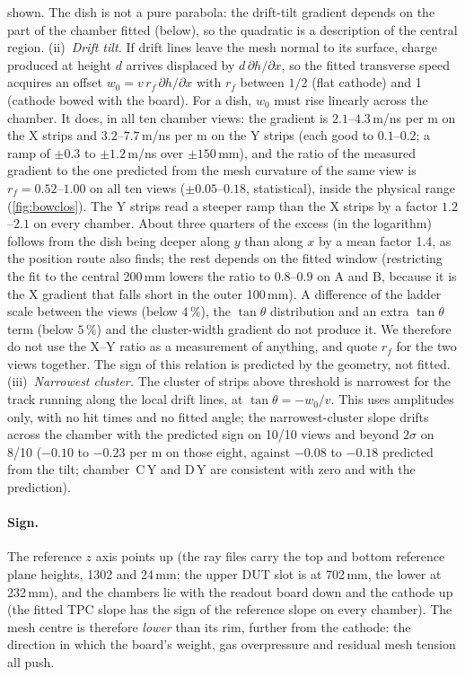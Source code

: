 shown. The dish is not a pure parabola: the drift-tilt gradient depends on the part of the chamber fitted (below), so the quadratic is a description of the
central region.
(ii)~\emph{Drift tilt.} If drift lines leave the mesh normal to its surface, charge produced at height $d$ arrives
displaced by $d\,\partial h/\partial x$, so the fitted transverse speed acquires an offset
$w_0 = v\,r_f\,\partial h/\partial x$ with $r_f$ between $1/2$ (flat cathode) and 1 (cathode bowed with the board).
For a dish, $w_0$ must rise linearly across the chamber. It does, in all ten chamber views: the gradient is
$2.1$--$4.3$\,\textmu m/ns per m on the X strips and $3.2$--$7.7$\,\textmu m/ns per m on the Y strips (each good to $0.1$--$0.2$; a ramp of $\pm0.3$ to
$\pm1.2$\,\textmu m/ns over $\pm150$\,mm), and the ratio of the measured gradient to the one predicted from the mesh curvature of the
same view is $r_f = 0.52$--$1.00$ on all ten views ($\pm0.05$--$0.18$, statistical), inside the physical range (\cref{fig:bowclos}). The Y strips read a steeper ramp than the X strips by a factor
$1.2$--$2.1$ on every chamber. About three quarters of the excess (in the logarithm) follows from the dish being deeper along $y$ than along $x$ by a mean
factor 1.4, as the position route also finds; the rest depends on the fitted window (restricting the fit to the central 200\,mm lowers the ratio to
$0.8$--$0.9$ on A and B, because it is the X gradient that falls short in the outer 100\,mm). A difference of the ladder scale between the views (below $4\,\%$),
the $\tan\theta$ distribution and an extra $\tan\theta$ term (below $5\,\%$) and the cluster-width gradient do not produce it. We therefore do not use the X--Y
ratio as a measurement of anything, and quote $r_f$ for the two views together. The sign of this relation is predicted by the geometry, not fitted.
(iii)~\emph{Narrowest cluster.} The cluster of strips above threshold is narrowest for the track running along the
local drift lines, at $\tan\theta = -w_0/v$. This uses amplitudes only, with no hit times and no fitted angle; the
narrowest-cluster slope drifts across the chamber with the predicted sign on 10/10 views and beyond $2\sigma$ on 8/10
($-0.10$ to $-0.23$ per m on those eight, against $-0.08$ to $-0.18$ predicted from the tilt; chamber~C\,Y and D\,Y are consistent with
zero and with the prediction).

\paragraph{Sign.}
The reference $z$ axis points up (the ray files carry the top and bottom reference plane heights, 1302 and 24\,mm; the upper DUT slot
is at 702\,mm, the lower at 232\,mm), and the chambers lie with the readout board down and the cathode up (the fitted
TPC slope has the sign of the reference slope on every chamber). The mesh centre is therefore \emph{lower} than its rim,
further from the cathode: the direction in which the board's weight, gas overpressure and residual mesh tension all push.

